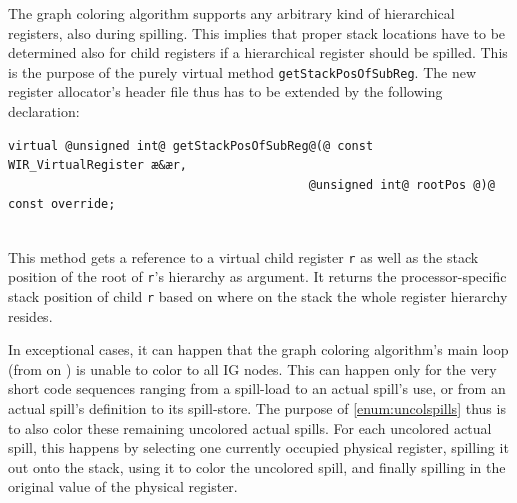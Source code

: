 The graph coloring algorithm supports any arbitrary kind of hierarchical registers, also during spilling.
This implies that proper stack locations have to be determined also for child registers if a hierarchical register should be spilled.
This is the purpose of the purely virtual method \texttt{getStackPosOfSubReg}.
The new register allocator's header file thus has to be extended by the following declaration: \\
\begin{lstlisting}[style=code,float=!ht,aboveskip=-0.8 \baselineskip,belowskip=-0.8 \baselineskip]
virtual @unsigned int@ getStackPosOfSubReg@(@ const WIR_VirtualRegister æ&ær,
                                          @unsigned int@ rootPos @)@ const override;
\end{lstlisting}
\\
This method gets a reference to a virtual child register \texttt{r} as well as the stack position of the root of \texttt{r}'s hierarchy as argument.
It returns the processor-specific stack position of child \texttt{r} based on where on the stack the whole register hierarchy resides.

In exceptional cases, it can happen that the graph coloring algorithm's main loop (from  on ) is unable to color to all \gls{IG} nodes.
This can happen only for the very short code sequences ranging from a spill-load to an actual spill's use, or from an actual spill's definition to its spill-store.
The purpose of \cref{enum:uncolspills} thus is to also color these remaining uncolored actual spills.
For each uncolored actual spill, this happens by selecting one currently occupied physical register, spilling it out onto the stack, using it to color the uncolored spill, and finally spilling in the original value of the physical register.

